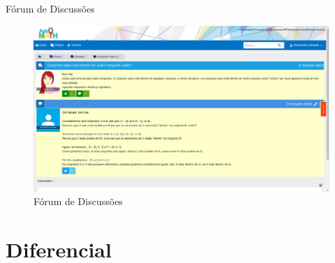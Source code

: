 \documentclass[10pt]{beamer}
\begin{document}
\begin{frame}{Fórum de Discussões}
	\begin{figure}[H]
		\centering
		\caption{F\'orum de Discussões}
		 \begin{minipage}[b]{1\textwidth}
			\includegraphics[width=\textwidth]{figuras/forum.png}
		\end{minipage}
	\end{figure}
\end{frame}

\section{Diferencial}

\end{document}
